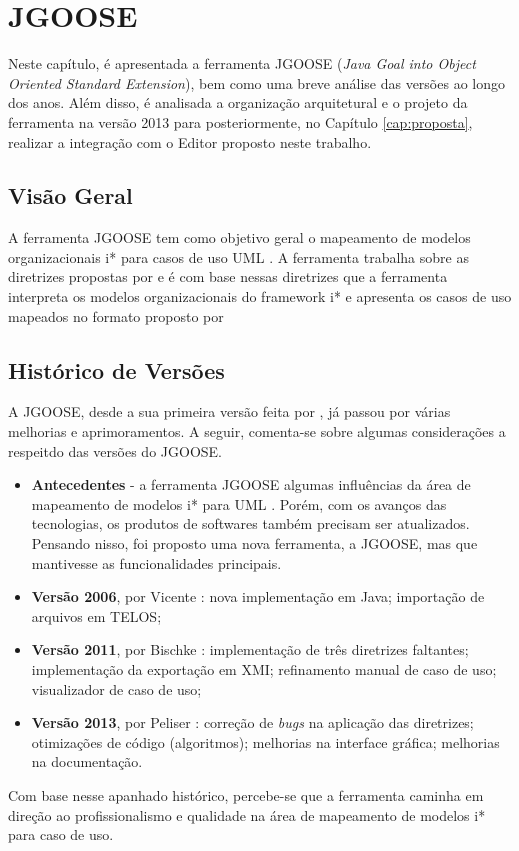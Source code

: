     \chapter{JGOOSE}
        \label{cap:jgoose}
            Neste capítulo,
            é apresentada a ferramenta JGOOSE (\emph{Java Goal into Object Oriented Standard Extension}), bem como uma breve análise das versões ao longo dos anos.
            Além disso, é analisada a organização arquitetural e o projeto da ferramenta na versão 2013 para posteriormente, no Capítulo \ref{cap:proposta}, realizar a integração com o Editor proposto neste trabalho.
    \section{Visão Geral}
            A ferramenta JGOOSE tem como objetivo geral o mapeamento de modelos organizacionais i* para casos de uso UML \cite{vicente2006}.
            A ferramenta trabalha sobre as diretrizes propostas por \cite{santander2002integrando} e é com base nessas diretrizes que a ferramenta interpreta os modelos organizacionais do framework i* e apresenta os casos de uso mapeados no formato proposto por \cite{cockburn2001writing}
    \section{Histórico de Versões}
            A JGOOSE, desde a sua primeira versão feita por \cite{vicente2006}, já passou por várias melhorias e aprimoramentos.
            A seguir, comenta-se sobre algumas considerações a respeitdo das versões do JGOOSE.
        \begin{itemize}
            \item \textbf{Antecedentes} - a ferramenta JGOOSE algumas influências da área de mapeamento de modelos i* para UML \cite{pedroza2004ferramentas}. Porém, com os avanços das tecnologias, os produtos de softwares também precisam ser atualizados.
            Pensando nisso, foi proposto uma nova ferramenta, a JGOOSE, mas que mantivesse as funcionalidades principais.

            \item \textbf{Versão 2006}, por Vicente \cite{vicente2006}: nova implementação em Java; importação de arquivos em TELOS; 

            \item \textbf{Versão 2011}, por Bischke \cite{brischke2011melhorando}: implementação de três diretrizes faltantes; implementação da exportação em XMI; refinamento manual de caso de uso; visualizador de caso de uso;

            \item \textbf{Versão 2013}, por Peliser \cite{peliser2013aprimorando}: correção de \emph{bugs} na aplicação das diretrizes; otimizações de código (algoritmos); melhorias na interface gráfica; melhorias na documentação.
        \end{itemize}
        Com base nesse apanhado histórico, percebe-se que a ferramenta caminha em direção ao profissionalismo e qualidade na área de mapeamento de modelos i* para caso de uso.
